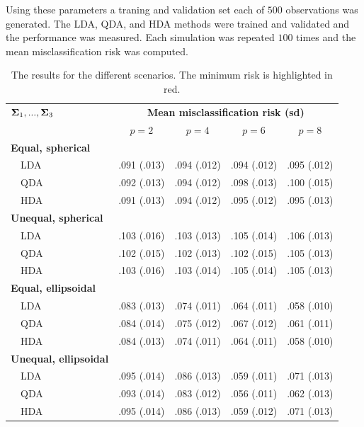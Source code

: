 \documentclass{article}\usepackage[]{graphicx}\usepackage[]{color}
\begin{document}
Using these parameters a traning and validation set each of $500$ observations was generated. The LDA, QDA, and HDA methods were trained and validated and the performance was measured.
Each simulation was repeated $100$ times and the mean misclassification risk was computed.

\providecommand{\red}{\color{red}}
\begin{table}[!tbp]
\begin{center}
\begin{tabular}{lllll}
\hline\hline
\multicolumn{1}{l}{\bfseries ${\boldsymbol{\Sigma}}_1, ..., {\boldsymbol{\Sigma}}_3$}&\multicolumn{4}{c}{\bfseries Mean misclassification risk (sd)}\tabularnewline
\cline{2-5}
\multicolumn{1}{l}{}&\multicolumn{1}{c}{$p = 2$}&\multicolumn{1}{c}{$p = 4$}&\multicolumn{1}{c}{$p = 6$}&\multicolumn{1}{c}{$p = 8$}\tabularnewline
\hline
{\bfseries Equal, spherical}&&&&\tabularnewline
   ~~LDA&\red   .091 (.013)&\red   .094 (.012)&\red   .094 (.012)&\red   .095 (.012)\tabularnewline
   ~~QDA&   .092 (.013)&   .094 (.012)&   .098 (.013)&   .100 (.015)\tabularnewline
   ~~HDA&   .091 (.013)&   .094 (.012)&   .095 (.012)&   .095 (.013)\tabularnewline
\hline
{\bfseries Unequal, spherical}&&&&\tabularnewline
   ~~LDA&   .103 (.016)&   .103 (.013)&   .105 (.014)&   .106 (.013)\tabularnewline
   ~~QDA&\red   .102 (.015)&\red   .102 (.013)&\red   .102 (.015)&\red   .105 (.013)\tabularnewline
   ~~HDA&   .103 (.016)&   .103 (.014)&   .105 (.014)&   .105 (.013)\tabularnewline
\hline
{\bfseries Equal, ellipsoidal}&&&&\tabularnewline
   ~~LDA&\red   .083 (.013)&\red   .074 (.011)&\red   .064 (.011)&\red   .058 (.010)\tabularnewline
   ~~QDA&   .084 (.014)&   .075 (.012)&   .067 (.012)&   .061 (.011)\tabularnewline
   ~~HDA&   .084 (.013)&   .074 (.011)&   .064 (.011)&   .058 (.010)\tabularnewline
\hline
{\bfseries Unequal, ellipsoidal}&&&&\tabularnewline
   ~~LDA&   .095 (.014)&   .086 (.013)&   .059 (.011)&   .071 (.013)\tabularnewline
   ~~QDA&\red   .093 (.014)&\red   .083 (.012)&\red   .056 (.011)&\red   .062 (.013)\tabularnewline
   ~~HDA&   .095 (.014)&   .086 (.013)&   .059 (.012)&   .071 (.013)\tabularnewline
\hline
\end{tabular}

\caption{The results for the different scenarios. The minimum risk is highlighted in red.\label{HDA_tab}}\end{center}

\end{table}
\end{document}
